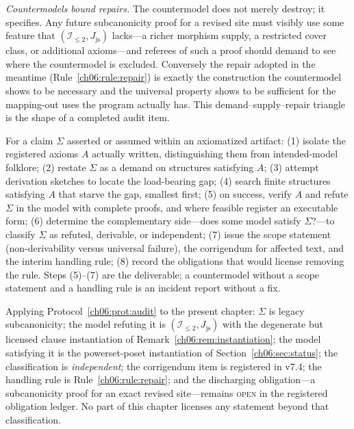 \emph{Countermodels bound repairs.} The countermodel does not merely
destroy; it specifies. Any future subcanonicity proof for a revised site
must visibly use some feature that $(\mathcal{I}_{\le 2},J_{\mathrm{js}})$
lacks---a richer morphism supply, a restricted cover class, or additional
axioms---and referees of such a proof should demand to see where the
countermodel is excluded. Conversely the repair adopted in the meantime
(Rule~\ref{ch06:rule:repair}) is exactly the construction the countermodel
shows to be necessary and the universal property shows to be sufficient
for the mapping-out uses the program actually has. This
demand--supply--repair triangle is the shape of a completed audit item.

\begin{protocol}\label{ch06:prot:audit}
For a claim $\Sigma$ asserted or assumed within an axiomatized artifact:
(1) isolate the registered axioms $A$ actually written, distinguishing
them from intended-model folklore; (2) restate $\Sigma$ as a demand on
structures satisfying $A$; (3) attempt derivation sketches to locate the
load-bearing gap; (4) search finite structures satisfying $A$ that starve
the gap, smallest first; (5) on success, verify $A$ and refute $\Sigma$ in
the model with complete proofs, and where feasible register an executable
form; (6) determine the complementary side---does some model satisfy
$\Sigma$?---to classify $\Sigma$ as refuted, derivable, or independent;
(7) issue the scope statement (non-derivability versus universal failure),
the corrigendum for affected text, and the interim handling rule; (8)
record the obligations that would license removing the rule.
Steps (5)--(7) are the deliverable; a countermodel without a scope
statement and a handling rule is an incident report without a fix.
\end{protocol}

\begin{boundary}\label{ch06:bnd:closing}
Applying Protocol~\ref{ch06:prot:audit} to the present chapter: $\Sigma$ is
legacy subcanonicity; the model refuting it is
$(\mathcal{I}_{\le 2},J_{\mathrm{js}})$ with the degenerate but licensed
clause instantiation of Remark~\ref{ch06:rem:instantiation}; the model
satisfying it is the powerset-poset instantiation of
Section~\ref{ch06:sec:status}; the classification is \emph{independent};
the corrigendum item is registered in v7.4; the handling rule is
Rule~\ref{ch06:rule:repair}; and the discharging obligation---a
subcanonicity proof for an exact revised site---remains \textsc{open} in
the registered obligation ledger. No part of this chapter licenses any
statement beyond that classification.
\end{boundary}

